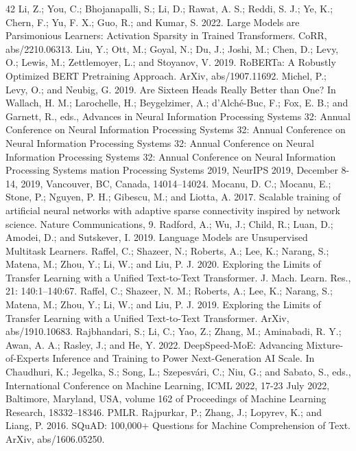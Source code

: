 \documentclass[10pt,twocolumn]{article}
\begin{document}
\begin{thebibliography}{42}
 Li, Z.; You, C.; Bhojanapalli, S.; Li, D.; Rawat, A. S.; Reddi, S. J.; Ye, K.; Chern, F.; Yu, F. X.; Guo, R.; and Kumar, S. 2022. Large Models are Parsimonious Learners: Activation Sparsity in Trained Transformers. CoRR, abs/2210.06313.
 Liu, Y.; Ott, M.; Goyal, N.; Du, J.; Joshi, M.; Chen, D.; Levy, O.; Lewis, M.; Zettlemoyer, L.; and Stoyanov, V. 2019. RoBERTa: A Robustly Optimized BERT Pretraining Approach. ArXiv, abs/1907.11692.
 Michel, P.; Levy, O.; and Neubig, G. 2019. Are Sixteen Heads Really Better than One? In Wallach, H. M.; Larochelle, H.; Beygelzimer, A.; d'Alché-Buc, F.; Fox, E. B.; and Garnett, R., eds., Advances in Neural Information Processing Systems 32: Annual Conference on Neural Information Processing Systems 32: Annual Conference on Neural Information Processing Systems 32: Annual Conference on Neural Information Processing Systems 32: Annual Conference on Neural Information Processing Systems
 mation Processing Systems 2019, NeurIPS 2019, December 8-14, 2019, Vancouver, BC, Canada, 14014–14024.
 Mocanu, D. C.; Mocanu, E.; Stone, P.; Nguyen, P. H.; Gibescu, M.; and Liotta, A. 2017. Scalable training of artificial neural networks with adaptive sparse connectivity inspired by network science. Nature Communications, 9.
 Radford, A.; Wu, J.; Child, R.; Luan, D.; Amodei, D.; and Sutskever, I. 2019. Language Models are Unsupervised Multitask Learners.
 Raffel, C.; Shazeer, N.; Roberts, A.; Lee, K.; Narang, S.; Matena, M.; Zhou, Y.; Li, W.; and Liu, P. J. 2020. Exploring the Limits of Transfer Learning with a Unified Text-to-Text Transformer. J. Mach. Learn. Res., 21: 140:1–140:67.
 Raffel, C.; Shazeer, N. M.; Roberts, A.; Lee, K.; Narang, S.; Matena, M.; Zhou, Y.; Li, W.; and Liu, P. J. 2019. Exploring the Limits of Transfer Learning with a Unified Text-to-Text Transformer. ArXiv, abs/1910.10683.
 Rajbhandari, S.; Li, C.; Yao, Z.; Zhang, M.; Aminabadi, R. Y.; Awan, A. A.; Rasley, J.; and He, Y. 2022. DeepSpeed-MoE: Advancing Mixture-of-Experts Inference and Training to Power Next-Generation AI Scale. In Chaudhuri, K.; Jegelka, S.; Song, L.; Szepesvári, C.; Niu, G.; and Sabato, S., eds., International Conference on Machine Learning, ICML 2022, 17-23 July 2022, Baltimore, Maryland, USA, volume 162 of Proceedings of Machine Learning Research, 18332–18346. PMLR.
 Rajpurkar, P.; Zhang, J.; Lopyrev, K.; and Liang, P. 2016. SQuAD: 100,000+ Questions for Machine Comprehension of Text. ArXiv, abs/1606.05250.

\end{thebibliography}
\end{document}
